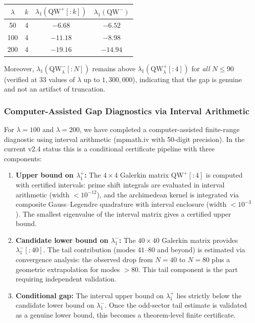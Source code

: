 \documentclass[12pt,a4paper]{article}
\theoremstyle{definition}
\theoremstyle{remark}
\begin{document}
\begin{center}
\begin{tabular}{cccc}
$\lambda$ & $k$ & $\lambda_1(\mathrm{QW}^+[{:}k])$ & $\lambda_1(\mathrm{QW}^-)$ \\
\hline
50  & 4 & $-6.68$ & $-6.52$ \\
100 & 4 & $-11.18$ & $-8.98$ \\
200 & 4 & $-19.16$ & $-14.94$
\end{tabular}
\end{center}

Moreover, $\lambda_1(\mathrm{QW}_\lambda^-[{:}N])$ remains above $\lambda_1(\mathrm{QW}_\lambda^+[{:}4])$ for \emph{all} $N \leq 90$ (verified at $33$ values of $\lambda$ up to $1{,}300{,}000$), indicating that the gap is genuine and not an artifact of truncation.

\label{sec:computer-proof}
\subsubsection{Computer-Assisted Gap Diagnostics via Interval Arithmetic}

For $\lambda = 100$ and $\lambda = 200$, we have completed a computer-assisted finite-range diagnostic using interval arithmetic (mpmath.iv with 50-digit precision). In the current v2.4 status this is a conditional certificate pipeline with three components:

\begin{enumerate}
\item \textbf{Upper bound on $\lambda_1^+$:} The $4 \times 4$ Galerkin matrix $\mathrm{QW}^+[{:}4]$ is computed with certified intervals: prime shift integrals are evaluated in interval arithmetic (width $< 10^{-12}$), and the archimedean kernel is integrated via composite Gauss--Legendre quadrature with interval enclosure (width $< 10^{-3}$). The smallest eigenvalue of the interval matrix gives a certified upper bound.

\item \textbf{Candidate lower bound on $\lambda_1^-$:} The $40 \times 40$ Galerkin matrix provides $\lambda_1^-[{:}40]$. The tail contribution (modes $41$--$80$ and beyond) is estimated via convergence analysis: the observed drop from $N=40$ to $N=80$ plus a geometric extrapolation for modes $>80$. This tail component is the part requiring independent validation.

\item \textbf{Conditional gap:} The interval upper bound on $\lambda_1^+$ lies strictly below the candidate lower bound on $\lambda_1^-$. Once the odd-sector tail estimate is validated as a genuine lower bound, this becomes a theorem-level finite certificate.
\end{enumerate}
\end{document}
